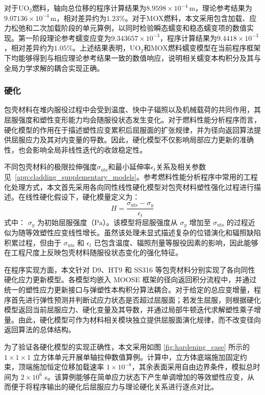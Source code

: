 对于UO$_2$燃料，轴向总位移的程序计算结果为$8.9598\times10^{-4}\,\mathrm{m}$，理论参考结果为$9.07136\times10^{-4}\,\mathrm{m}$，相对差异约为$1.23\%$。对于MOX燃料，本文采用包含加载、应力松弛和二次加载阶段的单元算例，以同时检验瞬态蠕变和稳态蠕变项的数值实现。第一阶段理论参考蠕变应变为$9.343657\times10^{-3}$，程序计算结果为$9.4418\times10^{-3}$，相对差异约为$1.05\%$。上述结果表明，UO$_2$和MOX燃料蠕变模型在当前程序框架下均能够得到与相应理论参考结果一致的数值响应，说明相关蠕变本构积分及其与全局力学求解的耦合实现正确。

\subsubsection{硬化}
包壳材料在堆内服役过程中会受到温度、快中子辐照以及机械载荷的共同作用，其屈服强度和塑性变形能力均会随服役状态发生变化。对于燃料性能分析程序而言，硬化模型的作用在于描述塑性应变累积后屈服面的扩张规律，并为径向返回算法提供屈服应力及其对内变量的导数。因此，硬化模型不仅影响局部应力更新的准确性，也会影响全局非线性迭代的收敛稳定性。

不同包壳材料的极限拉伸强度$\sigma_{\mathrm{uts}}$和最小延伸率$\epsilon_t$关系及相关参数见~\ref{app:cladding_supplementary_models}。参考燃料性能分析程序中常用的工程化处理方式，本文首先采用各向同性线性硬化模型对包壳材料塑性强化过程进行描述。在线性硬化假设下，硬化模量定义为：
\begin{equation}
	H = \frac{\sigma_{\mathrm{uts}}-\sigma_y}{\epsilon_t}
	\label{eq:linear_hardening_modulus}
\end{equation}
\noindent 式中： $\sigma_y$ 为初始屈服强度（$\mathrm{Pa}$）。该模型将屈服强度从 $\sigma_y$ 增加至 $\sigma_{\mathrm{uts}}$ 的过程近似为随等效塑性应变线性增长。虽然该处理未显式描述复杂的位错演化和辐照缺陷积累过程，但由于 $\sigma_{\mathrm{uts}}$ 和 $\epsilon_t$ 已包含温度、辐照剂量等服役因素的影响，因此能够在工程尺度上反映包壳材料随服役状态变化的强化特征。

在程序实现方面，本文针对 D9、HT9 和 SS316 等包壳材料分别实现了各向同性硬化应力更新模型。各模型均嵌入 MOOSE 框架的径向返回积分流程中，并通过统一的塑性应力更新接口与弹塑性本构积分算法耦合。对于给定的总应变增量，程序首先进行弹性预测并判断试应力状态是否超过屈服面；若发生屈服，则根据硬化模型返回当前屈服应力、硬化变量及其导数，并通过局部牛顿迭代求解塑性乘子增量。由此，硬化模型可作为材料相关模块独立提供屈服面演化规律，而不改变径向返回算法的总体结构。

为了验证各硬化模型的实现正确性，本文采用如图 \ref{fig:hardening_case} 所示的 $1\times1\times1$ 立方体单元开展单轴拉伸数值算例。计算中，立方体底端施加固定约束，顶端施加恒定位移加载速率 $1\times10^{-8}$，其余表面采用自由边界条件，模拟总时间为 $2\times10^6$ s。该算例能够在简单应力状态下产生单调增加的等效塑性应变，从而便于将程序输出的硬化后屈服应力与理论硬化关系进行逐点对比。

